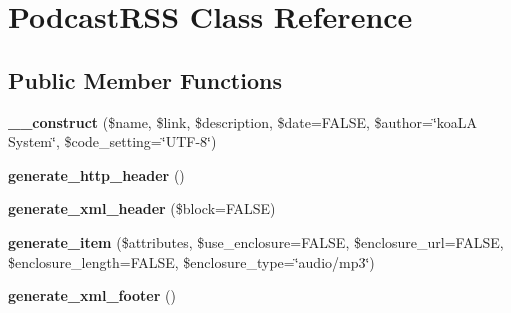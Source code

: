 \hypertarget{class_podcast_r_s_s}{
\section{PodcastRSS Class Reference}
\label{class_podcast_r_s_s}
}
\subsection*{Public Member Functions}
\begin{DoxyCompactItemize}
\item 
\hypertarget{class_podcast_r_s_s_ae06ea1b24e02534159ef8d5bc691f0fc}{
{\bfseries \_\-\_\-construct} (\$name, \$link, \$description, \$date=FALSE, \$author=\char`\"{}koaLA System\char`\"{}, \$code\_\-setting=\char`\"{}UTF-\/8\char`\"{})}
\label{class_podcast_r_s_s_ae06ea1b24e02534159ef8d5bc691f0fc}

\item 
\hypertarget{class_podcast_r_s_s_a03aafbdd0be9da86575ef8d1f91c7ccb}{
{\bfseries generate\_\-http\_\-header} ()}
\label{class_podcast_r_s_s_a03aafbdd0be9da86575ef8d1f91c7ccb}

\item 
\hypertarget{class_podcast_r_s_s_ae7d98bb996f685d4c4b94ede63af5035}{
{\bfseries generate\_\-xml\_\-header} (\$block=FALSE)}
\label{class_podcast_r_s_s_ae7d98bb996f685d4c4b94ede63af5035}

\item 
\hypertarget{class_podcast_r_s_s_a99cc1f25a7bca5ed44a5a6d151f3943f}{
{\bfseries generate\_\-item} (\$attributes, \$use\_\-enclosure=FALSE, \$enclosure\_\-url=FALSE, \$enclosure\_\-length=FALSE, \$enclosure\_\-type=\char`\"{}audio/mp3\char`\"{})}
\label{class_podcast_r_s_s_a99cc1f25a7bca5ed44a5a6d151f3943f}

\item 
\hypertarget{class_podcast_r_s_s_ae0889b28e3f0ff0a0442c603dc024db7}{
{\bfseries generate\_\-xml\_\-footer} ()}
\label{class_podcast_r_s_s_ae0889b28e3f0ff0a0442c603dc024db7}

\end{DoxyCompactItemize}
